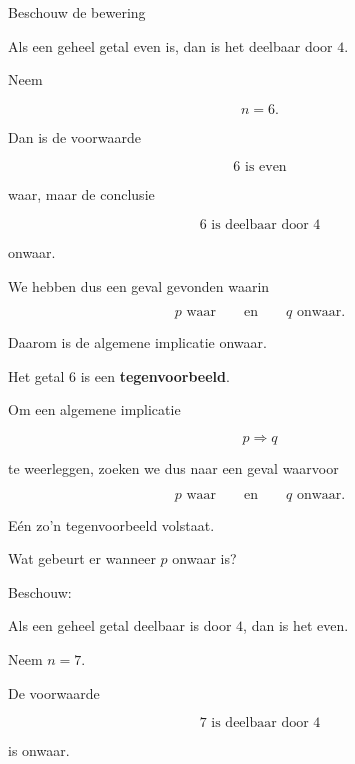 \documentclass{ximera}
\begin{document}
\begin{voorbeeld}

Beschouw de bewering

\begin{center}
Als een geheel getal even is, dan is het deelbaar door $4$.
\end{center}

Neem

\[
n=6.
\]

Dan is de voorwaarde

\[
6\text{ is even}
\]

waar, maar de conclusie

\[
6\text{ is deelbaar door }4
\]

onwaar.

We hebben dus een geval gevonden waarin

\[
p\text{ waar}
\qquad\text{en}\qquad
q\text{ onwaar}.
\]

Daarom is de algemene implicatie onwaar.

Het getal $6$ is een \textbf{tegenvoorbeeld}.

\end{voorbeeld}


\begin{opmerking}

Om een algemene implicatie

\[
p\Rightarrow q
\]

te weerleggen, zoeken we dus naar een geval waarvoor

\[
p\text{ waar}
\qquad\text{en}\qquad
q\text{ onwaar}.
\]

Eén zo'n tegenvoorbeeld volstaat.

\end{opmerking}



Wat gebeurt er wanneer $p$ onwaar is?

Beschouw:

\begin{center}
Als een geheel getal deelbaar is door $4$, dan is het even.
\end{center}

Neem $n=7$.

De voorwaarde

\[
7\text{ is deelbaar door }4
\]

is onwaar.
\end{document}

